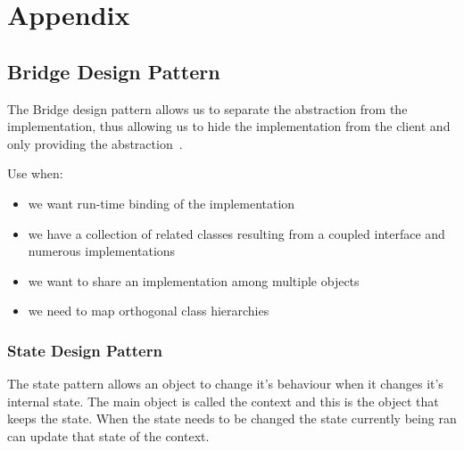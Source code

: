 \chapter{Appendix}

\section{Bridge Design Pattern}
The Bridge design pattern allows us to separate the abstraction from the implementation, thus
allowing us to hide the implementation from the client and only providing the abstraction~\citep{oodesign}.

Use when:
\begin{itemize}
	\item we want run-time binding of the implementation
	\item we have a collection of related classes resulting from a coupled interface and numerous
	implementations
	\item we want to share an implementation among multiple objects
	\item we need to map orthogonal class hierarchies
\end{itemize}

\subsection{State Design Pattern}
The state pattern allows an object to change it's behaviour when it changes it's internal state. The main object is called the context and this is the object that keeps the state. When the state needs to be changed the state currently being ran can update that state of the context.
